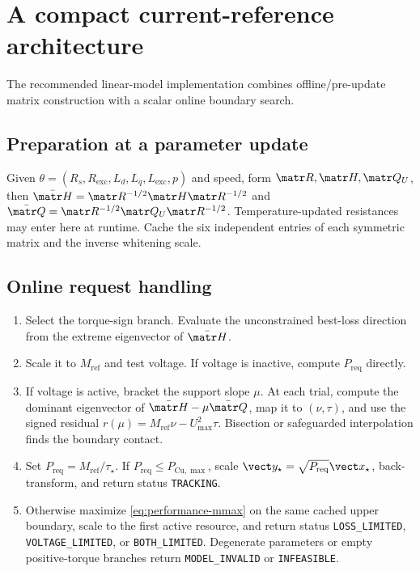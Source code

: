 \section{A compact current-reference architecture}
\label{sec:controller}

The recommended linear-model implementation combines offline/pre-update matrix
construction with a scalar online boundary search.

\subsection{Preparation at a parameter update}

Given
\(\theta=(R_s,R_{\mathrm{exc}},L_d,L_q,L_{\mathrm{exc}},p)\) and speed,
form \(\matr R,\matr H,\matr Q_U\), then
\(\bar{\matr H}=\matr R^{-1/2}\matr H\matr R^{-1/2}\) and
\(\bar{\matr Q}=\matr R^{-1/2}\matr Q_U\matr R^{-1/2}\). Temperature-updated
resistances may enter here at runtime. Cache the six independent entries of
each symmetric matrix and the inverse whitening scale.

\subsection{Online request handling}

\begin{enumerate}
 \item Select the torque-sign branch. Evaluate the unconstrained best-loss
       direction from the extreme eigenvector of \(\bar{\matr H}\).
 \item Scale it to \(M_{\mathrm{ref}}\) and test voltage. If voltage is
       inactive, compute \(P_{\mathrm{req}}\) directly.
 \item If voltage is active, bracket the support slope \(\mu\). At each trial,
       compute the dominant eigenvector of
       \(\bar{\matr H}-\mu\bar{\matr Q}\), map it to \((\nu,\tau)\), and use
       the signed residual
       \(r(\mu)=M_{\mathrm{ref}}\nu-U_{\max}^2\tau\).
       Bisection or safeguarded interpolation finds the boundary contact.
 \item Set \(P_{\mathrm{req}}=M_{\mathrm{ref}}/\tau_\star\). If
       \(P_{\mathrm{req}}\leq P_{\mathrm{Cu},\max}\), scale
       \(\vect y_\star=\sqrt{P_{\mathrm{req}}}\vect x_\star\), back-transform,
       and return status \texttt{TRACKING}.
 \item Otherwise maximize \cref{eq:performance-mmax} on the same cached upper
       boundary, scale to the first active resource, and return status
       \texttt{LOSS\_LIMITED}, \texttt{VOLTAGE\_LIMITED}, or
       \texttt{BOTH\_LIMITED}. Degenerate parameters or empty positive-torque
       branches return \texttt{MODEL\_INVALID} or \texttt{INFEASIBLE}.
\end{enumerate}

